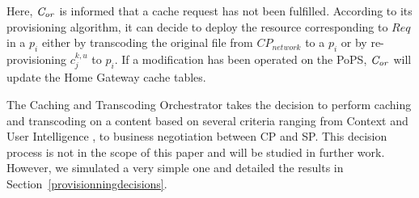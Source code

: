 Here, $\mathit{C_{or}}$ is informed that a cache request has not been fulfilled. According to its provisioning algorithm, it can decide to deploy the resource corresponding to $\mathit{Req}$ in a $p_{i}$ either by transcoding the original file from \(\mathit{CP}_{\mathit{network}}\) to a $p_{i}$ or by re-provisioning $c^{k,u}_{j}$ to $p_{i}$.
If a modification has been operated on the PoPS, $\mathit{C_{or}}$ will update the Home Gateway cache tables.

The Caching and Transcoding Orchestrator takes the decision to perform caching and transcoding on a content based on several criteria ranging from Context and User Intelligence \cite{wang_cpcdn:_2015}, to business negotiation between CP and SP.
This decision process is not in the scope of this paper and will be studied in further work. However, we simulated a very simple one and detailed the results in Section~\ref{provisionningdecisions}.


